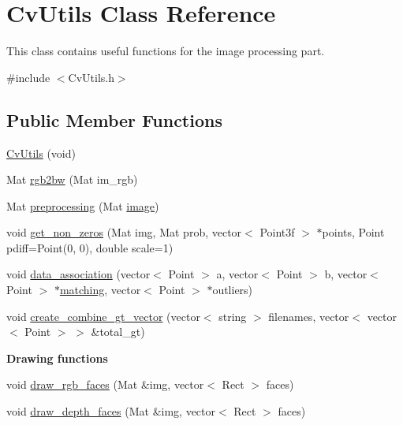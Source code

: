 \hypertarget{classCvUtils}{\section{Cv\-Utils Class Reference}
\label{classCvUtils}
}


This class contains useful functions for the image processing part.  




{\ttfamily \#include $<$Cv\-Utils.\-h$>$}

\subsection*{Public Member Functions}
\begin{DoxyCompactItemize}
\item 
\hyperlink{classCvUtils_ad292f6ff1df46556644e3161d048b3aa}{Cv\-Utils} (void)
\item 
Mat \hyperlink{classCvUtils_aa5bded11699d39af25c420aed2ade0ba}{rgb2bw} (Mat im\-\_\-rgb)
\item 
Mat \hyperlink{classCvUtils_a47189479acb67a1918f35557fc5906a6}{preprocessing} (Mat \hyperlink{create__ground__truth_8cpp_aabb27b8973575043030df51be47cd24a}{image})
\item 
void \hyperlink{classCvUtils_a426439fc003e5557644932eee66c48b6}{get\-\_\-non\-\_\-zeros} (Mat img, Mat prob, vector$<$ Point3f $>$ $\ast$points, Point pdiff=Point(0, 0), double scale=1)
\item 
void \hyperlink{classCvUtils_af0184944140cd71ef9ad9c6d3a89ca48}{data\-\_\-association} (vector$<$ Point $>$ a, vector$<$ Point $>$ b, vector$<$ Point $>$ $\ast$\hyperlink{social__robot__onethread_8cpp_a1ad5e89ff23cfb6db193cfd737de72f1}{matching}, vector$<$ Point $>$ $\ast$outliers)
\item 
void \hyperlink{classCvUtils_aaea7203de435f3395fb4842c5230ecc7}{create\-\_\-combine\-\_\-gt\-\_\-vector} (vector$<$ string $>$ filenames, vector$<$ vector$<$ Point $>$ $>$ \&total\-\_\-gt)
\end{DoxyCompactItemize}
\begin{Indent}{\bf Drawing functions}\par
\begin{DoxyCompactItemize}
\item 
void \hyperlink{classCvUtils_a74249b2e9b76b2a8ae2c01c4ff496663}{draw\-\_\-rgb\-\_\-faces} (Mat \&img, vector$<$ Rect $>$ faces)
\item 
void \hyperlink{classCvUtils_a6e1f3369c2b553c06f2692c75e20667d}{draw\-\_\-depth\-\_\-faces} (Mat \&img, vector$<$ Rect $>$ faces)
\end{DoxyCompactItemize}
\end{Indent}
